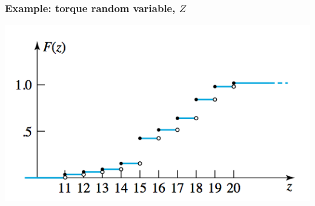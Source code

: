 \documentclass[handout]{beamer}\usepackage[]{graphicx}\usepackage[]{color}
\numberwithin{equation}{section}
\begin{document}
\begin{frame}
\frametitle{Example: torque random variable, $Z$}
 \includegraphics{../../fig/torquez.png}
\end{frame}
\end{document}

